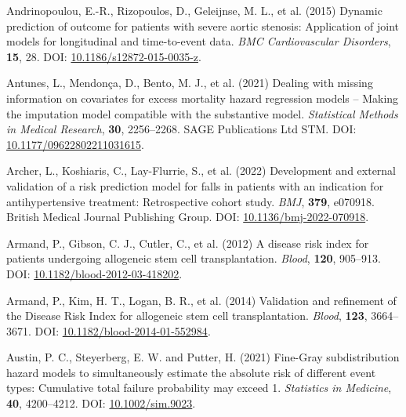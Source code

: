 \documentclass[
  letterpaper,
  DIV=11,
  numbers=noendperiod]{scrreprt}
\newlength{\cslhangindent}
\newlength{\cslentryspacingunit} %
\newenvironment{CSLReferences}[2] %
 {%
  \setlength{\parindent}{0pt}
  \ifodd #1
  \let\oldpar\par
  \def\par{\hangindent=\cslhangindent\oldpar}
  \fi
  \setlength{\parskip}{#2\cslentryspacingunit}
 }%
 {}
\begin{document}
\begin{CSLReferences}{1}{0}
\leavevmode{}%
Andrinopoulou, E.-R., Rizopoulos, D., Geleijnse, M. L., et al. (2015)
Dynamic prediction of outcome for patients with severe aortic stenosis:
Application of joint models for longitudinal and time-to-event data.
\emph{BMC Cardiovascular Disorders}, \textbf{15}, 28. DOI:
\href{https://doi.org/10.1186/s12872-015-0035-z}{10.1186/s12872-015-0035-z}.

\leavevmode{}%
Antunes, L., Mendonça, D., Bento, M. J., et al. (2021) Dealing with
missing information on covariates for excess mortality hazard regression
models -- {Making} the imputation model compatible with the substantive
model. \emph{Statistical Methods in Medical Research}, \textbf{30},
2256--2268. SAGE Publications Ltd STM. DOI:
\href{https://doi.org/10.1177/09622802211031615}{10.1177/09622802211031615}.

\leavevmode{}%
Archer, L., Koshiaris, C., Lay-Flurrie, S., et al. (2022) Development
and external validation of a risk prediction model for falls in patients
with an indication for antihypertensive treatment: Retrospective cohort
study. \emph{BMJ}, \textbf{379}, e070918. British Medical Journal
Publishing Group. DOI:
\href{https://doi.org/10.1136/bmj-2022-070918}{10.1136/bmj-2022-070918}.

\leavevmode{}%
Armand, P., Gibson, C. J., Cutler, C., et al. (2012) A disease risk
index for patients undergoing allogeneic stem cell transplantation.
\emph{Blood}, \textbf{120}, 905--913. DOI:
\href{https://doi.org/10.1182/blood-2012-03-418202}{10.1182/blood-2012-03-418202}.

\leavevmode{}%
Armand, P., Kim, H. T., Logan, B. R., et al. (2014) Validation and
refinement of the {Disease Risk Index} for allogeneic stem cell
transplantation. \emph{Blood}, \textbf{123}, 3664--3671. DOI:
\href{https://doi.org/10.1182/blood-2014-01-552984}{10.1182/blood-2014-01-552984}.

\leavevmode{}%
Austin, P. C., Steyerberg, E. W. and Putter, H. (2021) Fine-{Gray}
subdistribution hazard models to simultaneously estimate the absolute
risk of different event types: {Cumulative} total failure probability
may exceed 1. \emph{Statistics in Medicine}, \textbf{40}, 4200--4212.
DOI: \href{https://doi.org/10.1002/sim.9023}{10.1002/sim.9023}.


\end{CSLReferences}
\end{document}
